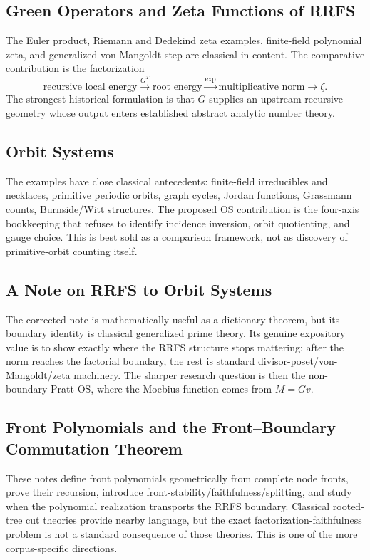 \documentclass[11pt]{article}
\begin{document}
\subsection{Green Operators and Zeta Functions of RRFS}
The Euler product, Riemann and Dedekind zeta examples, finite-field polynomial zeta, and generalized von Mangoldt step are classical in content. The comparative contribution is the factorization
\[
 \text{recursive local energy}\xrightarrow{G^T}\text{root energy}
 \xrightarrow{\exp}\text{multiplicative norm}\xrightarrow{}\zeta.
\]
The strongest historical formulation is that $G$ supplies an upstream recursive geometry whose output enters established abstract analytic number theory.

\subsection{Orbit Systems}
The examples have close classical antecedents: finite-field irreducibles and necklaces, primitive periodic orbits, graph cycles, Jordan functions, Grassmann counts, Burnside/Witt structures. The proposed OS contribution is the four-axis bookkeeping that refuses to identify incidence inversion, orbit quotienting, and gauge choice. This is best sold as a comparison framework, not as discovery of primitive-orbit counting itself.

\subsection{A Note on RRFS to Orbit Systems}
The corrected note is mathematically useful as a dictionary theorem, but its boundary identity is classical generalized prime theory. Its genuine expository value is to show exactly where the RRFS structure stops mattering: after the norm reaches the factorial boundary, the rest is standard divisor-poset/von-Mangoldt/zeta machinery. The sharper research question is then the non-boundary Pratt OS, where the Moebius function comes from $M=Gv$.

\subsection{Front Polynomials and the Front--Boundary Commutation Theorem}
These notes define front polynomials geometrically from complete node fronts, prove their recursion, introduce front-stability/faithfulness/splitting, and study when the polynomial realization transports the RRFS boundary. Classical rooted-tree cut theories provide nearby language, but the exact factorization-faithfulness problem is not a standard consequence of those theories. This is one of the more corpus-specific directions.
\end{document}
